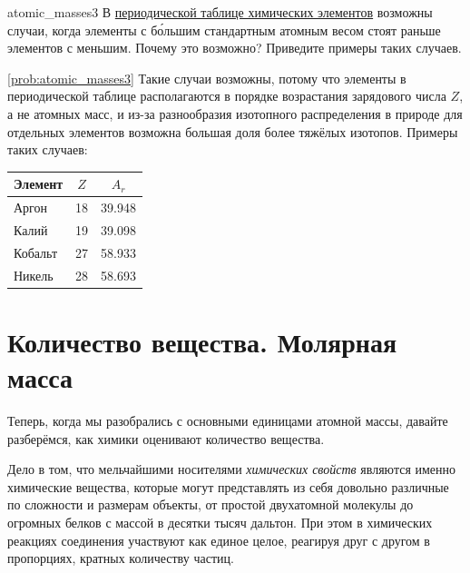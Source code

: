 \begin{problem}{}{atomic_masses3}
    В \hyperref[appendix:periodic_table]{периодической таблице химических элементов} возможны случаи, когда элементы с б\'{о}льшим стандартным атомным весом стоят раньше элементов с меньшим. Почему это возможно? Приведите примеры таких случаев.
    \begin{sol}{\ref{prob:atomic_masses3}}
        Такие случаи возможны, потому что элементы в периодической таблице располагаются в порядке возрастания зарядового числа $Z$, а не атомных масс, и из-за разнообразия изотопного распределения в природе для отдельных элементов возможна большая доля более тяжёлых изотопов. Примеры таких случаев:

        \begin{center}
            \small
            \begin{tabular}{lcc}
                \hline
                \rowcolor{table_header}Элемент & $Z$ & $A_r$ \\
                \hline
                Аргон & 18 & \num{39,948} \\
                Калий & 19 & \num{39,098} \\
                \hline
                Кобальт & 27 & \num{58,933} \\
                Никель & 28 & \num{58,693} \\
                \hline
            \end{tabular}
        \end{center}
    \end{sol}
\end{problem}

\clearpage

\section{Количество вещества. Молярная масса}

Теперь, когда мы разобрались с основными единицами атомной массы, давайте разберёмся, как химики оценивают количество вещества.

Дело в том, что мельчайшими носителями \emph{химических свойств} являются именно химические вещества, которые могут представлять из себя довольно различные по сложности и размерам объекты, от простой двухатомной молекулы до огромных белков с массой в десятки тысяч дальтон. При этом в химических реакциях соединения участвуют как единое целое, реагируя друг с другом в пропорциях, кратных количеству частиц.

